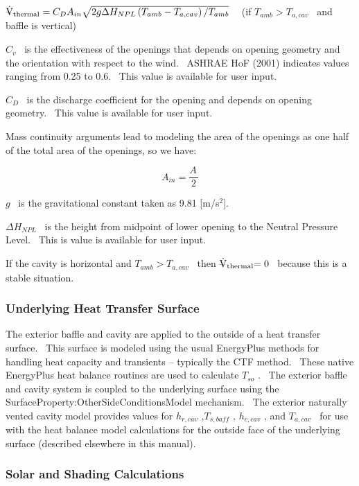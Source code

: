\({{\rm{\rlap{--} \dot V}}_{{\rm{thermal}}}} = {C_D}{A_{in}}\sqrt {2g\Delta {H_{NPL}}\left( {{T_{amb}} - {T_{a,cav}}} \right)/{T_{amb}}}\) ~ (if \(T_{amb} > T_{a,cav}\) ~and baffle is vertical)

\({C_v}\) ~is the effectiveness of the openings that depends on opening geometry and the orientation with respect to the wind.~ ASHRAE HoF (2001) indicates values ranging from 0.25 to 0.6.~ This value is available for user input.

\({C_D}\) ~is the discharge coefficient for the opening and depends on opening geometry.~ This value is available for user input.

Mass continuity arguments lead to modeling the area of the openings as one half of the total area of the openings, so we have:

\begin{equation}
{A_{in}} = \frac{{A\,}}{2}
\end{equation}

\(g\) ~is the gravitational constant taken as 9.81 {[}m/s\(^{2}\){]}.

\(\Delta {H_{NPL}}\) ~is the height from midpoint of lower opening to the Neutral Pressure Level.~ This is value is available for user input.

If the cavity is horizontal and \(T_{amb} > T_{a,cav}\) ~then \({{\rm{\rlap{--} \dot V}}_{{\rm{thermal}}}}{\rm{ = 0}}\) ~because this is a stable situation.

\subsubsection{Underlying Heat Transfer Surface}\label{underlying-heat-transfer-surface}

The exterior baffle and cavity are applied to the outside of a heat transfer surface.~ This surface is modeled using the usual EnergyPlus methods for handling heat capacity and transients -- typically the CTF method.~ These native EnergyPlus heat balance routines are used to calculate \({T_{so}}\) .~ The exterior baffle and cavity system is coupled to the underlying surface using the SurfaceProperty:OtherSideConditionsModel mechanism.~ The exterior naturally vented cavity model provides values for \({h_{r,cav}}\) ,\({T_{s,baff}}\) , \({h_{c,cav}}\) , and \({T_{a,cav}}\) ~for use with the heat balance model calculations for the outside face of the underlying surface (described elsewhere in this manual).

\subsubsection{Solar and Shading Calculations}\label{solar-and-shading-calculations}

